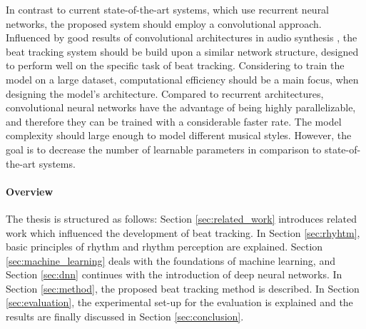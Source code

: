 \documentclass{scrartcl}
\begin{document}
In contrast to current state-of-the-art systems, which use recurrent neural networks, the proposed system should employ a convolutional approach. Influenced by good results of convolutional architectures in audio synthesis \cite{Oord2016}, the beat tracking system should be build upon a similar network structure, designed to perform well on the specific task of beat tracking. Considering to train the model on a large dataset, computational efficiency should be a main focus, when designing the model's architecture. Compared to recurrent architectures, convolutional neural networks have the advantage of being highly parallelizable, and therefore they can be trained with a considerable faster rate. The model complexity should large enough to model different musical styles. However, the goal is to decrease the number of learnable parameters in comparison to state-of-the-art systems.














\paragraph{Overview} The thesis is structured as follows: Section \ref{sec:related_work} introduces related work which influenced the development of beat tracking. In Section \ref{sec:rhyhtm}, basic principles of rhythm and rhythm perception are explained. Section \ref{sec:machine_learning} deals with the foundations of machine learning, and Section \ref{sec:dnn} continues with the introduction of deep neural networks. In Section \ref{sec:method}, the proposed beat tracking method is described. In Section \ref{sec:evaluation}, the experimental set-up for the evaluation is explained and the results are finally discussed in Section \ref{sec:conclusion}. 

\end{document}

